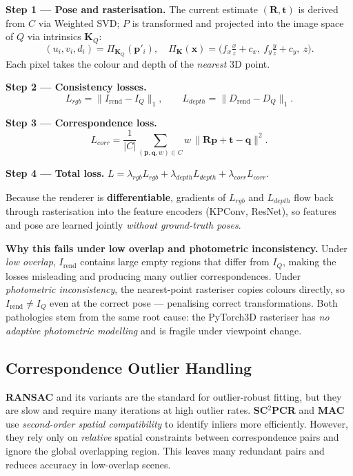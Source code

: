 \documentclass[11pt,a4paper]{article}
\begin{document}
\textbf{Step 1 — Pose and rasterisation.} The current estimate $(\mathbf{R},\mathbf{t})$
is derived from $C$ via Weighted SVD; $P$ is transformed and projected into the image
space of $Q$ via intrinsics $\mathbf{K}_Q$:
\[
  (u_i,v_i,d_i) = \Pi_{\mathbf{K}_Q}(\mathbf{p}'_i),\quad
  \Pi_{\mathbf{K}}(\mathbf{x}) = \big(f_x\tfrac{x}{z}+c_x,\ f_y\tfrac{y}{z}+c_y,\ z\big).
\]
Each pixel takes the colour and depth of the \emph{nearest} 3D point.

\textbf{Step 2 — Consistency losses.}
\[
  L_{rgb} = \lVert I_{\text{rend}} - I_Q \rVert_1, \qquad
  L_{depth} = \lVert D_{\text{rend}} - D_Q \rVert_1.
\]

\textbf{Step 3 — Correspondence loss.}
\[
  L_{corr} = \frac{1}{|C|}\sum_{(\mathbf{p},\mathbf{q},w)\in C}
  w\, \lVert \mathbf{R}\mathbf{p} + \mathbf{t} - \mathbf{q} \rVert^2.
\]

\textbf{Step 4 — Total loss.}
$L = \lambda_{rgb}L_{rgb} + \lambda_{depth}L_{depth} + \lambda_{corr}L_{corr}$.

Because the renderer is \textbf{differentiable}, gradients of $L_{rgb}$ and $L_{depth}$
flow back through rasterisation into the feature encoders (KPConv, ResNet), so features
and pose are learned jointly \emph{without ground-truth poses}.

\textbf{Why this fails under low overlap and photometric inconsistency.}
Under \emph{low overlap}, $I_{\text{rend}}$ contains large empty regions that differ from
$I_Q$, making the losses misleading and producing many outlier correspondences.
Under \emph{photometric inconsistency}, the nearest-point rasteriser copies colours
directly, so $I_{\text{rend}} \neq I_Q$ even at the correct pose — penalising correct
transformations. Both pathologies stem from the same root cause: the PyTorch3D rasteriser
has \emph{no adaptive photometric modelling} and is fragile under viewpoint change.

\subsection{Correspondence Outlier Handling}

\textbf{RANSAC} and its variants are the standard for outlier-robust fitting, but they
are slow and require many iterations at high outlier rates.
\textbf{SC$^2$PCR} and \textbf{MAC} use \emph{second-order spatial compatibility} to
identify inliers more efficiently. However, they rely only on \emph{relative} spatial
constraints between correspondence pairs and ignore the global overlapping region. This
leaves many redundant pairs and reduces accuracy in low-overlap scenes.
\end{document}

